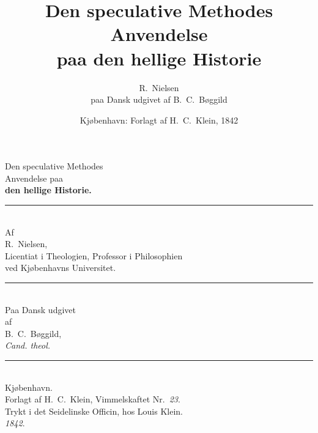 \documentclass[12pt]{book}
\title{\textbf{Den speculative Methodes Anvendelse\\ paa den hellige Historie}}
\author{R.\ Nielsen\\[4pt]
  \normalsize paa Dansk udgivet af B.\ C.\ Bøggild}
\date{Kjøbenhavn: Forlagt af H.\ C.\ Klein, 1842}
\begin{document}
\frontmatter
\maketitle
\thispagestyle{empty}

\tableofcontents


\cleardoublepage
\thispagestyle{empty}
{}
\begin{center}
  {\Large Den speculative Methodes}\\[1.3\baselineskip]
  {\large Anvendelse paa}\\[1.3\baselineskip]
  {\huge\bfseries den hellige Historie.}\\[1.1\baselineskip]
  \rule{4em}{0.4pt}\\[1.8\baselineskip]
  Af\\[0.9\baselineskip]
  {\Large R.\ Nielsen,}\\[0.4\baselineskip]
  {\small Licentiat i Theologien, Professor i Philosophien\\
   ved Kjøbenhavns Universitet.}\\[1.3\baselineskip]
  \rule{9em}{0.4pt}\\[1.5\baselineskip]
  Paa Dansk udgivet\\[0.5\baselineskip]
  af\\[0.5\baselineskip]
  {\Large B.\ C.\ Bøggild,}\\[0.35\baselineskip]
  {\small\textit{Cand. theol.}}\\[2.6\baselineskip]
  \rule{13em}{0.4pt}\\[1.6\baselineskip]
  {\large Kjøbenhavn.}\\[0.5\baselineskip]
  {\small Forlagt af H.\ C.\ Klein, Vimmelskaftet Nr.\ \textit{23}.\\
   Trykt i det Seidelinske Officin, hos Louis Klein.\\[0.3\baselineskip]
   \textit{1842}.}
\end{center}
\end{document}
